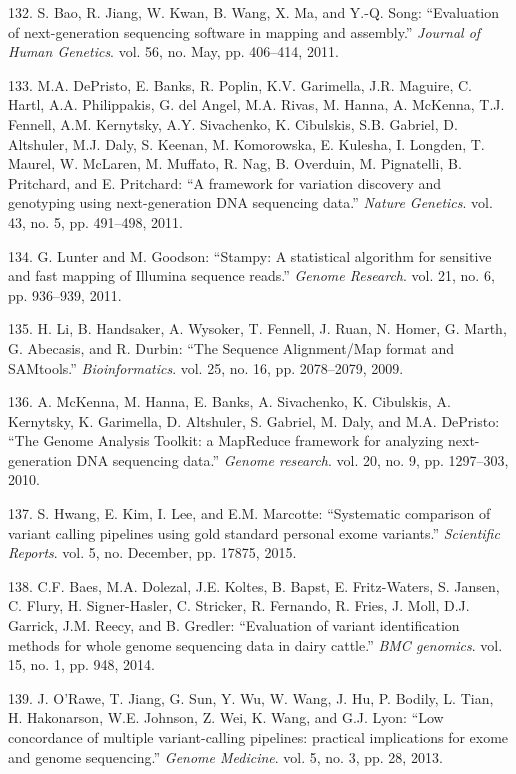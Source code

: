 \documentclass[12pt,twoside]{ugathesis}
\theoremstyle{definition}
\theoremstyle{definition}
\theoremstyle{remark}
\begin{document}
\hypertarget{ref-Bao2011}{}
132. S. Bao, R. Jiang, W. Kwan, B. Wang, X. Ma, and Y.-Q. Song:
``Evaluation of next-generation sequencing software in mapping and
assembly.'' \emph{Journal of Human Genetics}. vol. 56, no. May, pp.
406--414, 2011.

\hypertarget{ref-DePristo2011}{}
133. M.A. DePristo, E. Banks, R. Poplin, K.V. Garimella, J.R. Maguire,
C. Hartl, A.A. Philippakis, G. del Angel, M.A. Rivas, M. Hanna, A.
McKenna, T.J. Fennell, A.M. Kernytsky, A.Y. Sivachenko, K. Cibulskis,
S.B. Gabriel, D. Altshuler, M.J. Daly, S. Keenan, M. Komorowska, E.
Kulesha, I. Longden, T. Maurel, W. McLaren, M. Muffato, R. Nag, B.
Overduin, M. Pignatelli, B. Pritchard, and E. Pritchard: ``A framework
for variation discovery and genotyping using next-generation DNA
sequencing data.'' \emph{Nature Genetics}. vol. 43, no. 5, pp. 491--498,
2011.

\hypertarget{ref-Lunter2011}{}
134. G. Lunter and M. Goodson: ``Stampy: A statistical algorithm for
sensitive and fast mapping of Illumina sequence reads.'' \emph{Genome
Research}. vol. 21, no. 6, pp. 936--939, 2011.

\hypertarget{ref-Li2009}{}
135. H. Li, B. Handsaker, A. Wysoker, T. Fennell, J. Ruan, N. Homer, G.
Marth, G. Abecasis, and R. Durbin: ``The Sequence Alignment/Map format
and SAMtools.'' \emph{Bioinformatics}. vol. 25, no. 16, pp. 2078--2079,
2009.

\hypertarget{ref-McKenna2010}{}
136. A. McKenna, M. Hanna, E. Banks, A. Sivachenko, K. Cibulskis, A.
Kernytsky, K. Garimella, D. Altshuler, S. Gabriel, M. Daly, and M.A.
DePristo: ``The Genome Analysis Toolkit: a MapReduce framework for
analyzing next-generation DNA sequencing data.'' \emph{Genome research}.
vol. 20, no. 9, pp. 1297--303, 2010.

\hypertarget{ref-Hwang2015}{}
137. S. Hwang, E. Kim, I. Lee, and E.M. Marcotte: ``Systematic
comparison of variant calling pipelines using gold standard personal
exome variants.'' \emph{Scientific Reports}. vol. 5, no. December, pp.
17875, 2015.

\hypertarget{ref-Baes2014}{}
138. C.F. Baes, M.A. Dolezal, J.E. Koltes, B. Bapst, E. Fritz-Waters, S.
Jansen, C. Flury, H. Signer-Hasler, C. Stricker, R. Fernando, R. Fries,
J. Moll, D.J. Garrick, J.M. Reecy, and B. Gredler: ``Evaluation of
variant identification methods for whole genome sequencing data in dairy
cattle.'' \emph{BMC genomics}. vol. 15, no. 1, pp. 948, 2014.

\hypertarget{ref-ORawe2013}{}
139. J. O'Rawe, T. Jiang, G. Sun, Y. Wu, W. Wang, J. Hu, P. Bodily, L.
Tian, H. Hakonarson, W.E. Johnson, Z. Wei, K. Wang, and G.J. Lyon: ``Low
concordance of multiple variant-calling pipelines: practical
implications for exome and genome sequencing.'' \emph{Genome Medicine}.
vol. 5, no. 3, pp. 28, 2013.
\end{document}
